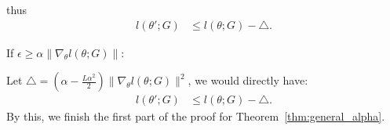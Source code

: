 \qquad thus
\begin{equation}
\begin{aligned}
    l(\theta';G) &\leq l(\theta;G) - \triangle.
\end{aligned}
\end{equation}

If $\epsilon \geq \alpha \|\nabla_{\theta}l(\theta;G)\|$:

\qquad Let $\triangle = (\alpha - \frac{L\alpha^2}{2})\|\nabla_{\theta}l(\theta;G)\|^2$, we would directly have:
\begin{equation}
\begin{aligned}
    l(\theta';G) &\leq l(\theta;G) - \triangle.
\end{aligned}
\end{equation}
By this, we finish the first part of the proof for Theorem~\ref{thm:general_alpha}. 


